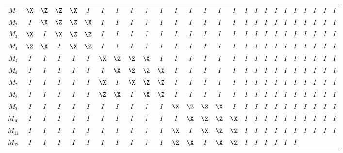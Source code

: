 \begin{table}
{\setlength{\tabcolsep}{0.1em}
	\begin{tabular}{c|ccccc|ccccc|ccccc|ccccc|ccccc}
		$M_1$ & $\X$ & $\Z$ & $\Z$ & $\X$ & $I$ & $I$ & $I$ & $I$ & $I$ & $I$ &
		$I$ & $I$ & $I$ & $I$ & $I$ & $I$ & $I$ & $I$ & $I$ & $I$ & $I$ & $I$ &
		$I$ & $I$ & $I$ \\
		$M_2$ & $I$ & $\X$ & $\Z$ & $\Z$ & $\X$ & $I$ & $I$ & $I$ & $I$ & $I$ &
		$I$ & $I$ & $I$ & $I$ & $I$ & $I$ & $I$ & $I$ & $I$ & $I$ & $I$ & $I$ &
		$I$ & $I$ & $I$ \\
		$M_3$ & $\X$ & $I$ & $\X$ & $\Z$ & $\Z$ & $I$ & $I$ & $I$ & $I$ & $I$ &
		$I$ & $I$ & $I$ & $I$ & $I$ & $I$ & $I$ & $I$ & $I$ & $I$ & $I$ & $I$ &
		$I$ & $I$ & $I$ \\
		$M_4$ & $\Z$ & $\X$ & $I$ & $\X$ & $\Z$ & $I$ & $I$ & $I$ & $I$ & $I$ &
		$I$ & $I$ & $I$ & $I$ & $I$ & $I$ & $I$ & $I$ & $I$ & $I$ & $I$ & $I$ &
		$I$ & $I$ & $I$ \\
		$M_5$ & $I$ & $I$ & $I$ & $I$ & $I$ & $\X$ & $\Z$ & $\Z$ & $\X$ & $I$ &
		$I$ & $I$ & $I$ & $I$ & $I$ & $I$ & $I$ & $I$ & $I$ & $I$ & $I$ & $I$ &
		$I$ & $I$ & $I$ \\
		$M_6$ & $I$ & $I$ & $I$ & $I$ & $I$ & $I$ & $\X$ & $\Z$ & $\Z$ & $\X$ &
		$I$ & $I$ & $I$ & $I$ & $I$ & $I$ & $I$ & $I$ & $I$ & $I$ & $I$ & $I$ &
		$I$ & $I$ & $I$ \\
		$M_7$ & $I$ & $I$ & $I$ & $I$ & $I$ & $\X$ & $I$ & $\X$ & $\Z$ & $\Z$ &
		$I$ & $I$ & $I$ & $I$ & $I$ & $I$ & $I$ & $I$ & $I$ & $I$ & $I$ & $I$ &
		$I$ & $I$ & $I$ \\
		$M_8$ & $I$ & $I$ & $I$ & $I$ & $I$ & $\Z$ & $\X$ & $I$ & $\X$ & $\Z$ &
		$I$ & $I$ & $I$ & $I$ & $I$ & $I$ & $I$ & $I$ & $I$ & $I$ & $I$ & $I$ &
		$I$ & $I$ & $I$ \\
		$M_9$ & $I$ & $I$ & $I$ & $I$ & $I$ & $I$ & $I$ & $I$ & $I$ & $I$ & $\X$
		& $\Z$ & $\Z$ & $\X$ & $I$ & $I$ & $I$ & $I$ & $I$ & $I$ & $I$ & $I$ &
		$I$ & $I$ & $I$ \\
		$M_{10}$ & $I$ & $I$ & $I$ & $I$ & $I$ & $I$ & $I$ & $I$ & $I$ & $I$ & $I$
		& $\X$ & $\Z$ & $\Z$ & $\X$ & $I$ & $I$ & $I$ & $I$ & $I$ & $I$ & $I$ &
		$I$ & $I$ & $I$ \\
		$M_{11}$ & $I$ & $I$ & $I$ & $I$ & $I$ & $I$ & $I$ & $I$ & $I$ & $I$ &
		$\X$ & $I$ & $\X$ & $\Z$ & $\Z$ & $I$ & $I$ & $I$ & $I$ & $I$ & $I$ &
		$I$ & $I$ & $I$ & $I$ \\
		$M_{12}$ & $I$ & $I$ & $I$ & $I$ & $I$ & $I$ & $I$ & $I$ & $I$ & $I$ &
		$\Z$ & $\X$ & $I$ & $\X$ & $\Z$ & $I$ & $I$ & $I$ & $I$ & $I$ & $I$ &

\end{tabular}}
\end{table}
